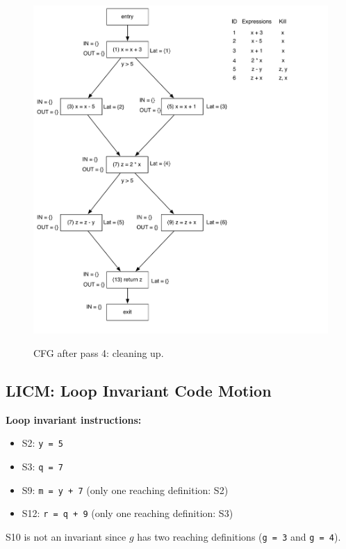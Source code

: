 \documentclass[12pt]{article}
\begin{document}
\begin{figure}[!htbp]
    \centering
    \caption{CFG after pass 4: cleaning up.}
    \includegraphics[scale=0.65]{cfg4_2.pdf}
    \label{fig:cfg4_2}
\end{figure}

\newpage

\subsection{LICM: Loop Invariant Code Motion}

\textbf{Loop invariant instructions:}

\begin{itemize}
   \item S2: \texttt{y = 5}
   \item S3: \texttt{q = 7}
   \item S9: \texttt{m = y + 7} (only one reaching definition: S2)
   \item S12: \texttt{r = q + 9} (only one reaching definition: S3)
\end{itemize}

S10 is not an invariant since $g$ has two reaching definitions (\texttt{g = 3} and \texttt{g = 4}).
\end{document}
